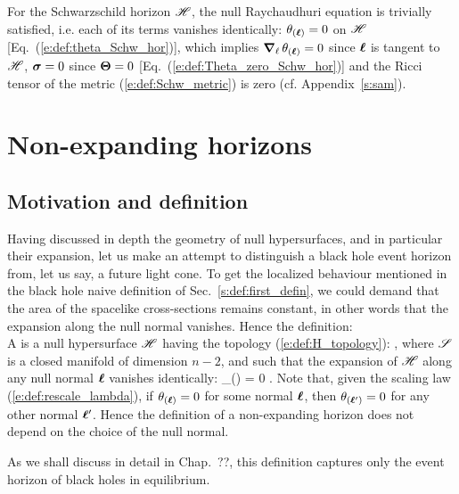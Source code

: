 {{\begin{example} \label{x:def:Schw_hor9}
For the Schwarzschild horizon $\mathscr{H}$, the null Raychaudhuri equation is
trivially satisfied, i.e. each of its terms vanishes identically:
$\theta_{(\bm{\ell})}=0$ on $\mathscr{H}$ [Eq.~(\ref{e:def:theta_Schw_hor})],
which implies $\bm{\nabla}_{\ell}\,  \theta_{(\bm{\ell})}=0$ since $\bm{\ell}$ is tangent to $\mathscr{H}$,
$\bm{\sigma}=0$ since $\bm{\Theta}=0$ [Eq.~(\ref{e:def:Theta_zero_Schw_hor})]
and the Ricci tensor of the metric (\ref{e:def:Schw_metric}) is zero
(cf. Appendix~\ref{s:sam}).
\end{example}


\section{Non-expanding horizons}

\subsection{Motivation and definition}

Having discussed in depth the geometry of null hypersurfaces, and in particular
their expansion, let us make an attempt to distinguish a black hole event
horizon from, let us say, a future light cone.
To get the localized behaviour mentioned in the black hole naive definition
of Sec.~\ref{s:def:first_defin}, we could demand that the area of the
spacelike cross-sections remains constant, in other words that
the expansion along the null normal vanishes. Hence the definition:\\
A  is a null hypersurface $\mathscr{H}$ having the
topology (\ref{e:def:H_topology}):
\be
    \Hor \simeq \R \times \Sp,
\ee
where $\mathscr{S}$ is a closed manifold of dimension $n-2$,
and such that the expansion of $\mathscr{H}$ along any null normal $\bm{\ell}$ vanishes
identically:
\be
    \theta_{(\wl)} = 0 .
\ee
Note that, given the scaling law (\ref{e:def:rescale_lambda}),
if $\theta_{(\bm{\ell})} = 0$ for some normal $\bm{\ell}$, then  $\theta_{(\bm{\ell}')} = 0$
for any other normal $\bm{\ell}'$. Hence the definition of a non-expanding horizon
does not depend on the choice of the null normal.

As we shall discuss in detail in Chap.~??, this definition captures only
the event horizon of black holes in equilibrium.

}}
